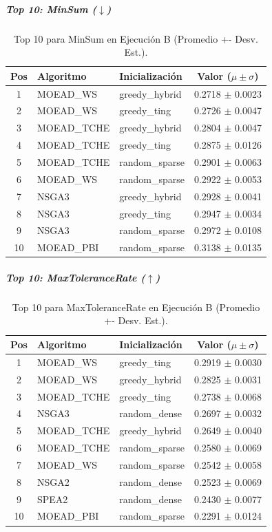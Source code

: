 \documentclass[a4paper,10pt]{article}
\begin{document}
\subparagraph{Top 10: MinSum ($\downarrow$)}
\begin{table}[H]
    \centering
    \begin{tabular}{cllc}
        \toprule
        Pos & Algoritmo & Inicialización & Valor ($\mu \pm \sigma$) \\
        \midrule
        1 & MOEAD\_WS & greedy\_hybrid & 0.2718 $\pm$ 0.0023 \\
        2 & MOEAD\_WS & greedy\_ting & 0.2726 $\pm$ 0.0047 \\
        3 & MOEAD\_TCHE & greedy\_hybrid & 0.2804 $\pm$ 0.0047 \\
        4 & MOEAD\_TCHE & greedy\_ting & 0.2875 $\pm$ 0.0126 \\
        5 & MOEAD\_TCHE & random\_sparse & 0.2901 $\pm$ 0.0063 \\
        6 & MOEAD\_WS & random\_sparse & 0.2922 $\pm$ 0.0053 \\
        7 & NSGA3 & greedy\_hybrid & 0.2928 $\pm$ 0.0041 \\
        8 & NSGA3 & greedy\_ting & 0.2947 $\pm$ 0.0034 \\
        9 & NSGA3 & random\_sparse & 0.2972 $\pm$ 0.0108 \\
        10 & MOEAD\_PBI & random\_sparse & 0.3138 $\pm$ 0.0135 \\
        \bottomrule
    \end{tabular}
    \caption{Top 10 para MinSum en Ejecución B (Promedio +- Desv. Est.).}
\end{table}

\subparagraph{Top 10: MaxToleranceRate ($\uparrow$)}
\begin{table}[H]
    \centering
    \begin{tabular}{cllc}
        \toprule
        Pos & Algoritmo & Inicialización & Valor ($\mu \pm \sigma$) \\
        \midrule
        1 & MOEAD\_WS & greedy\_ting & 0.2919 $\pm$ 0.0030 \\
        2 & MOEAD\_WS & greedy\_hybrid & 0.2825 $\pm$ 0.0031 \\
        3 & MOEAD\_TCHE & greedy\_ting & 0.2738 $\pm$ 0.0068 \\
        4 & NSGA3 & random\_dense & 0.2697 $\pm$ 0.0032 \\
        5 & MOEAD\_TCHE & greedy\_hybrid & 0.2649 $\pm$ 0.0040 \\
        6 & MOEAD\_TCHE & random\_sparse & 0.2580 $\pm$ 0.0069 \\
        7 & MOEAD\_WS & random\_sparse & 0.2542 $\pm$ 0.0058 \\
        8 & NSGA2 & random\_dense & 0.2523 $\pm$ 0.0069 \\
        9 & SPEA2 & random\_dense & 0.2430 $\pm$ 0.0077 \\
        10 & MOEAD\_PBI & random\_sparse & 0.2291 $\pm$ 0.0124 \\
        \bottomrule
    \end{tabular}
    \caption{Top 10 para MaxToleranceRate en Ejecución B (Promedio +- Desv. Est.).}
\end{table}
\end{document}

